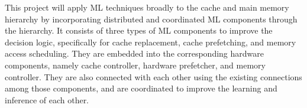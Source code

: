 

%
%
%


This project will apply ML techniques broadly to the cache and main memory
hierarchy by incorporating distributed and coordinated ML components through the
hierarchy.  It consists of three types of ML components to improve the decision
logic, specifically for cache replacement, cache prefetching, and memory access
scheduling.  They are embedded into the corresponding hardware components,
namely cache controller, hardware prefetcher, and memory controller.  They are
also connected with each other using the existing connections among those
components, and are coordinated to improve the learning and inference of each
other.

